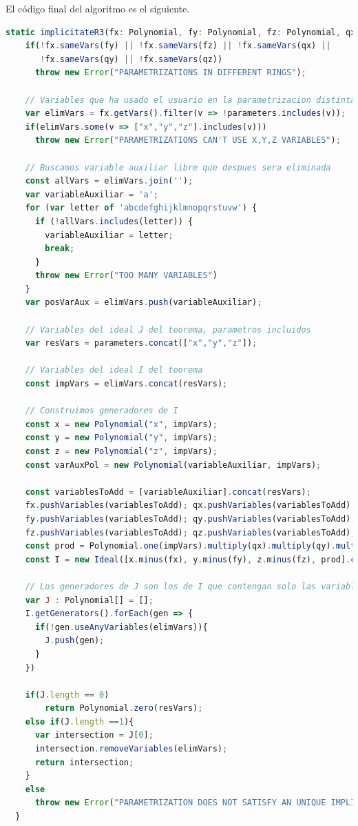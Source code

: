 El código final del algoritmo es el siguiente.
\begin{lstlisting}[language=JavaScript, caption=Algoritmo de implicitación]
static implicitateR3(fx: Polynomial, fy: Polynomial, fz: Polynomial, qx: Polynomial, qy: Polynomial, qz: Polynomial, parameters: string[] = []){
    if(!fx.sameVars(fy) || !fx.sameVars(fz) || !fx.sameVars(qx) || 
       !fx.sameVars(qy) || !fx.sameVars(qz))
      throw new Error("PARAMETRIZATIONS IN DIFFERENT RINGS");

    // Variables que ha usado el usuario en la parametrizacion distintas a x,y,z
    var elimVars = fx.getVars().filter(v => !parameters.includes(v));
    if(elimVars.some(v => ["x","y","z"].includes(v)))
      throw new Error("PARAMETRIZATIONS CAN'T USE X,Y,Z VARIABLES");

    // Buscamos variable auxiliar libre que despues sera eliminada
    const allVars = elimVars.join('');
    var variableAuxiliar = 'a';
    for (var letter of 'abcdefghijklmnopqrstuvw') {
      if (!allVars.includes(letter)) {
        variableAuxiliar = letter;
        break;
      }
      throw new Error("TOO MANY VARIABLES")
    }
    var posVarAux = elimVars.push(variableAuxiliar);
   
    // Variables del ideal J del teorema, parametros incluidos
    var resVars = parameters.concat(["x","y","z"]);

    // Variables del ideal I del teorema
    const impVars = elimVars.concat(resVars);

    // Construimos generadores de I
    const x = new Polynomial("x", impVars);
    const y = new Polynomial("y", impVars);
    const z = new Polynomial("z", impVars);
    const varAuxPol = new Polynomial(variableAuxiliar, impVars);

    const variablesToAdd = [variableAuxiliar].concat(resVars);
    fx.pushVariables(variablesToAdd); qx.pushVariables(variablesToAdd);
    fy.pushVariables(variablesToAdd); qy.pushVariables(variablesToAdd);
    fz.pushVariables(variablesToAdd); qz.pushVariables(variablesToAdd);
    const prod = Polynomial.one(impVars).multiply(qx).multiply(qy).multiply(qz).multiply(varAuxPol);
    const I = new Ideal([x.minus(fx), y.minus(fy), z.minus(fz), prod].concat());

    // Los generadores de J son los de I que contengan solo las variables de resVars
    var J : Polynomial[] = [];
    I.getGenerators().forEach(gen => {
      if(!gen.useAnyVariables(elimVars)){
        J.push(gen);
      }
    })

    if(J.length == 0)   
        return Polynomial.zero(resVars);
    else if(J.length ==1){
      var intersection = J[0];
      intersection.removeVariables(elimVars);
      return intersection;
    }
    else
      throw new Error("PARAMETRIZATION DOES NOT SATISFY AN UNIQUE IMPLICIT EQUATION");
  }
\end{lstlisting}








